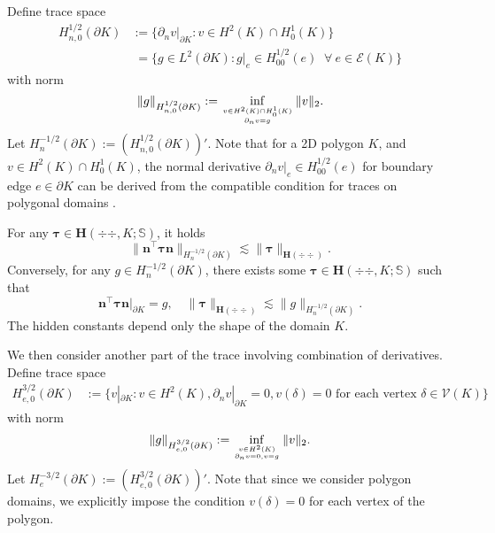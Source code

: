 Define trace space
\begin{align*}
H_{n,0}^{1/2}(\partial K)&:=\{\partial_n v|_{\partial K}: v\in H^2(K)\cap H_0^1(K)\} \\
&\;=\{g\in L^2(\partial K): g|_e\in H_{00}^{1/2}(e)\;\;\forall~e\in\mathcal E(K)\}
\end{align*}
with norm
\[
\|g\|_{H_{n,0}^{1/2}(\partial K)}:=\inf_{v\in H^2(K)\cap H_0^1(K)\atop \partial_n v=g}\|v\|_2.
\]
Let $H_n^{-1/2}(\partial K):=(H_{n,0}^{1/2}(\partial K))'$. Note that for a 2D polygon $K$, and $v\in H^2(K)\cap H_0^1(K)$, the normal derivative $\partial_n v|_{e}\in H_{00}^{1/2}(e)$ for boundary edge $e\in \partial K$ can be derived from the compatible condition for traces on polygonal domains \cite[Theorem 1.5.2.8]{Grisvard:2011Elliptic}.

\begin{lemma}
For any $\boldsymbol \tau\in\boldsymbol{H}(\div{\div },K; \mathbb{S})$,  it holds
\[
\|\boldsymbol  n^{\intercal}\boldsymbol \tau\boldsymbol  n\|_{H_n^{-1/2}(\partial K)}\lesssim \|\boldsymbol{\tau}\|_{\boldsymbol{H}(\div{\div })}.
\]
Conversely, for any $g\in H_n^{-1/2}(\partial K)$, there exists some $\boldsymbol \tau\in\boldsymbol{H}(\div{\div },K; \mathbb{S})$ such that
\[
\boldsymbol  n^{\intercal}\boldsymbol \tau\boldsymbol  n|_{\partial K}=g, \quad
\|\boldsymbol{\tau}\|_{\boldsymbol{H}(\div{\div })} \lesssim \|g\|_{H_n^{-1/2}(\partial K)}.
\]
The hidden constants depend only the shape of the domain $K$.
\end{lemma}

We then consider another part of the trace involving combination of derivatives. Define trace space
\begin{align*}
H_{e,0}^{3/2}(\partial K)&:=\{v|_{\partial K}: v\in H^2(K), \partial_nv|_{\partial K}=0, v(\delta)=0 \textrm{ for each vertex } \delta\in\mathcal V(K)\}
\end{align*}
with norm
\[
\|g\|_{H_{e,0}^{3/2}(\partial K)}:=\inf_{v\in H^2(K)\atop \partial_n v=0, v=g}\|v\|_2.
\]
Let $H_e^{-3/2}(\partial K):=(H_{e,0}^{3/2}(\partial K))'$. Note that since we consider polygon domains, we explicitly impose the condition $v(\delta) = 0$ for each vertex of the polygon. %


